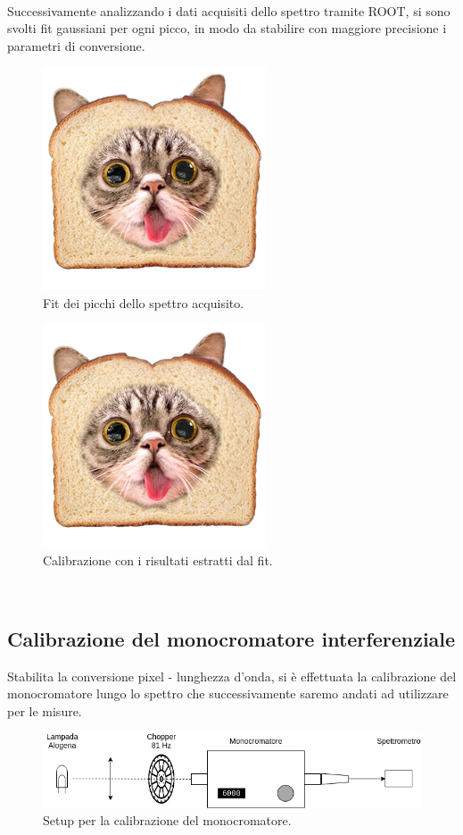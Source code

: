 \documentclass[11pt]{article} %
\begin{document}
\\Successivamente analizzando i dati acquisiti dello spettro tramite ROOT, si sono svolti fit gaussiani per ogni picco, in modo da stabilire con maggiore precisione i parametri di conversione.
\begin{figure}[h!]
\begin{center}
\includegraphics[height=250px]{img/placeholder.png}
\caption{Fit dei picchi dello spettro acquisito.}
\end{center}
\end{figure}
\begin{figure}[h!]
\begin{center}
\includegraphics[height=250px]{img/placeholder.png}
\caption{Calibrazione con i risultati estratti dal fit.}
\end{center}
\end{figure}
\\
\subsection{Calibrazione del monocromatore interferenziale}
Stabilita la conversione pixel - lunghezza d'onda, si è effettuata la calibrazione del monocromatore lungo lo spettro che successivamente saremo andati ad utilizzare per le misure.
\begin{figure}[h!]
\begin{center}
\includegraphics[width=450px]{img/cal_mono.png}
\caption{Setup per la calibrazione del monocromatore.}
\end{center}
\end{figure}
\end{document}
